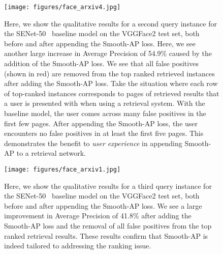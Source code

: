 \documentclass[runningheads]{llncs}
\newcommand\beforecaptions{\vspace{-3mm}}
\newcommand\aftercaptions{\vspace{-5mm}}
\begin{document}
\begin{figure}[htp]
\begin{center}
   \texttt{[image: figures/face\_arxiv4.jpg]}
\end{center}
\vspace{-10pt}
\beforecaptions

    \caption{\small{Here, we show the qualitative results for a second query instance for the SENet-50~\cite{Cao18} baseline model on the VGGFace2 test set, both before and after appending the Smooth-AP loss. Here, we see another large increase in Average Precision of 54.9\% caused by the addition of the Smooth-AP loss. We see that all false positives (shown in red) are removed from the top ranked retrieved instances after adding the Smooth-AP loss. Take the situation where each row of top-ranked instances corresponds to pages of retrieved results that a user is presented with when using a retrieval system. With the baseline model, the user comes across many false positives in the first few pages. After appending the Smooth-AP loss, the user encounters no false positives in at least the first five pages. This demonstrates the benefit to {\em user experience} in appending Smooth-AP to a retrieval network.}}

 \aftercaptions
 \vspace{-1mm}
 \label{face_2}
\end{figure}

\begin{figure}[htp]
\begin{center}
   \texttt{[image: figures/face\_arxiv1.jpg]}
\end{center}
\vspace{-10pt}
\beforecaptions
   \caption{\small{Here, we show the qualitative results for a third query instance for the SENet-50~\cite{Cao18} baseline model on the VGGFace2 test set, both before and after appending the Smooth-AP loss. We see a large improvement in Average Precision of 41.8\% after adding the Smooth-AP loss and the removal of all false positives from the top ranked retrieval results. These results confirm that Smooth-AP is indeed tailored to addressing the ranking issue.}}
 \aftercaptions
 \vspace{-1mm}
 \label{face_3}
\end{figure}
\end{document}
